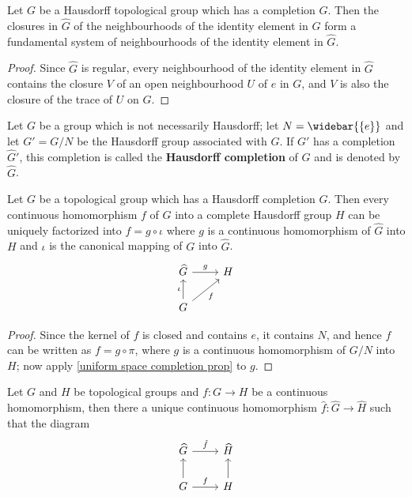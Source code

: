 \begin{proposition}\label{topological group base of identity in completion is closure}
Let $G$ be a Hausdorff topological group which has a completion $\widehat{G}$. Then the closures in $\widehat{G}$ of the neighbourhoods of the identity element in $G$ form a fundamental system of neighbourhoods of the identity element in $\widehat{G}$.
\end{proposition}
\begin{proof}
Since $\widehat{G}$ is regular, every neighbourhood of the identity element in $\widehat{G}$ contains the closure $V$ of an open neighbourhood $U$ of $e$ in $G$, and $V$ is also the closure of the trace of $U$ on $G$.
\end{proof}
Let $G$ be a group which is not necessarily Hausdorff; let $N=\widebar{\{e\}}$ and let $G'=G/N$ be the Hausdorff group associated with $G$. If $G'$ has a completion $\widehat{G}'$, this completion is called the \textbf{Hausdorff completion} of $G$ and is denoted by $\widehat{G}$.
\begin{proposition}\label{topological group homomorphism into complete Hausdorff extension}
Let $G$ be a topological group which has a Hausdorff completion $\widehat{G}$. Then every continuous homomorphism $f$ of $G$ into a complete Hausdorff group $H$ can be uniquely factorized into $f=g\circ\iota$ where $g$ is a continuous homomorphism of $\widehat{G}$ into $H$ and $\iota$ is the canonical mapping of $G$ into $\widehat{G}$.
\[\begin{tikzcd}
\widehat{G}\ar[r,"g"]&H\\
G\ar[ru,swap,"f"]\ar[u,"\iota"]
\end{tikzcd}\]
\end{proposition}
\begin{proof}
Since the kernel of $f$ is closed and contains $e$, it contains $N$, and hence $f$ can be written as $f=g\circ\pi$, where $g$ is a continuous homomorphism of $G/N$ into $H$; now apply \cref{uniform space completion prop} to $g$.
\end{proof}
\begin{proposition}
Let $G$ and $H$ be topological groups and $f:G\to H$ be a continuous homomorphism, then there a unique continuous homomorphism $\hat{f}:\widehat{G}\to\widehat{H}$ such that the diagram
\[\begin{tikzcd}
\widehat{G}\ar[r,"\hat{f}"]&\widehat{H}\\
G\ar[u]\ar[r,"f"]&H\ar[u]
\end{tikzcd}\]
\end{proposition}
